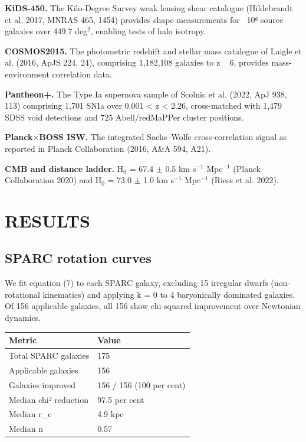 \documentclass[a4paper,fleqn,usenatbib]{mnras}
\begin{document}
\textbf{KiDS-450.} The Kilo-Degree Survey weak lensing shear catalogue (Hildebrandt et al. 2017, MNRAS 465, 1454) provides shape measurements for ~10⁶ source galaxies over 449.7 deg$^{2}$, enabling tests of halo isotropy.

\textbf{COSMOS2015.} The photometric redshift and stellar mass catalogue of Laigle et al. (2016, ApJS 224, 24), comprising 1,182,108 galaxies to z ~ 6, provides mass-environment correlation data.

\textbf{Pantheon+.} The Type Ia supernova sample of Scolnic et al. (2022, ApJ 938, 113) comprising 1,701 SNIa over 0.001 < z < 2.26, cross-matched with 1,479 SDSS void detections and 725 Abell/redMaPPer cluster positions.

\textbf{Planck$\times$BOSS ISW.} The integrated Sachs–Wolfe cross-correlation signal as reported in Planck Collaboration (2016, A&A 594, A21).

\textbf{CMB and distance ladder.} H$_0$ = 67.4 $\pm$ 0.5 km s$^{-1}$ Mpc$^{-1}$ (Planck Collaboration 2020) and H$_0$ = 73.0 $\pm$ 1.0 km s$^{-1}$ Mpc$^{-1}$ (Riess et al. 2022).



\section{RESULTS}\label{sec:4-results}


\subsection{SPARC rotation curves}\label{sec:4-1-sparc-rotation-curves}

We fit equation (7) to each SPARC galaxy, excluding 15 irregular dwarfs (non-rotational kinematics) and applying k = 0 to 4 baryonically dominated galaxies. Of 156 applicable galaxies, all 156 show chi-squared improvement over Newtonian dynamics.

\begin{table}
\centering
\begin{tabular}{ll}
\hline
Metric & Value \\
\hline
Total SPARC galaxies & 175 \\
Applicable galaxies & 156 \\
Galaxies improved & 156 / 156 (100 per cent) \\
Median chi² reduction & 97.5 per cent \\
Median r\_c & 4.9 kpc \\
Median n & 0.57 \\
\hline
\end{tabular}
\end{table}
\end{document}
